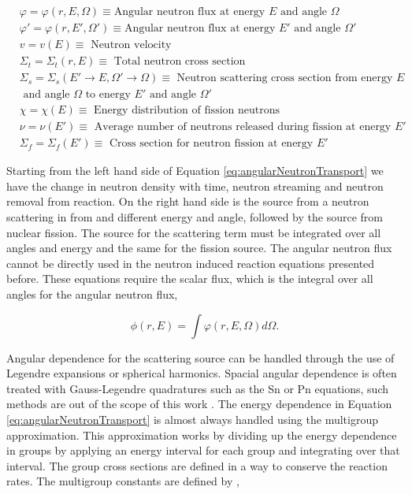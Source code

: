 \clearpage

$\begin{aligned}
&\varphi = \varphi(r, E, \Omega) \equiv   \text{Angular neutron flux at energy } E \text{ and angle } \Omega  \\
&\varphi' = \varphi(r, E', \Omega') \equiv   \text{Angular neutron flux at energy } E' \text{ and angle } \Omega'  \\
& v = v(E) \equiv \text{ Neutron velocity} \\
&\Sigma_{t} = \Sigma_{t}(r, E) \equiv \text{ Total neutron cross section} \\
&\Sigma_{s} = \Sigma_{s}(E' \rightarrow E,\Omega' \rightarrow \Omega) \equiv \text{ Neutron scattering cross section from energy } E \\
& \text{ and angle } \Omega \text{ to energy } E' \text{ and angle } \Omega' \\
&\chi = \chi(E) \equiv \text{ Energy distribution of fission neutrons} \\
&\nu = \nu(E') \equiv \text{ Average number of neutrons released during fission at energy } E' \\ 
&\Sigma_{f} = \Sigma_{f}(E') \equiv \text{ Cross section for neutron fission at energy } E' 
\end{aligned}$

\vspace{0.5cm}

\noindent Starting from the left hand side of Equation \ref{eq:angularNeutronTransport} we have the change in neutron density with time, neutron streaming and neutron removal from reaction. On the right hand side is the source from a neutron scattering in from and different energy and angle, followed by the source from nuclear fission. The source for the scattering term must be integrated over all angles and energy and the same for the fission source. The angular neutron flux cannot be directly used in the neutron induced reaction equations presented before. These equations require the scalar flux, which is the integral over all angles for the angular neutron flux,

\begin{equation}
    \phi(r,E) = \int \varphi(r,E,\Omega)d \Omega.
\end{equation}

Angular dependence for the scattering source can be handled through the use of Legendre expansions or spherical harmonics. Spacial angular dependence is often treated with Gauss-Legendre quadratures such as the Sn or Pn equations, such methods are out of the scope of this work \cite{millerCompTransport}. The energy dependence in Equation \ref{eq:angularNeutronTransport} is almost always handled using the multigroup approximation. This approximation works by dividing up the energy dependence in groups by applying an energy interval for each group and integrating over that interval. The group cross sections are defined in a way to conserve the reaction rates. The multigroup constants are defined by \cite{millerCompTransport} \cite{duderstadt1976},


